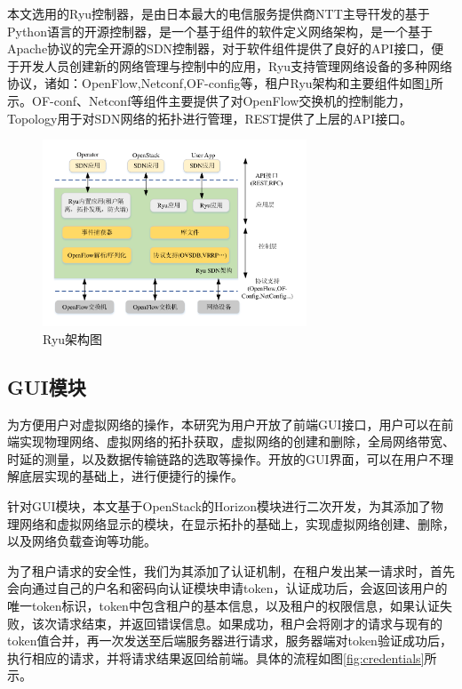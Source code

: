 本文选用的Ryu控制器，是由日本最大的电信服务提供商NTT主导幵发的基于Python语言的开源控制器，是一个基于组件的软件定义网络架构，是一个基于Apache协议的完全开源的SDN控制器，对于软件组件提供了良好的API接口，便于开发人员创建新的网络管理与控制中的应用，Ryu支持管理网络设备的多种网络协议，诸如：OpenFlow,Netconf,OF-config等，租户Ryu架构和主要组件如图\ref{fig:ryu}所示。OF-conf、Netconf等组件主要提供了对OpenFlow交换机的控制能力，Topology用于对SDN网络的拓扑进行管理，REST提供了上层的API接口。

\begin{figure}[!htb]
  \centering
  \includegraphics[width=0.7\textwidth]{logo/ryu}
  \caption{Ryu架构图}
  \label{fig:ryu}
\end{figure}

\subsection{GUI模块}
为方便用户对虚拟网络的操作，本研究为用户开放了前端GUI接口，用户可以在前端实现物理网络、虚拟网络的拓扑获取，虚拟网络的创建和删除，全局网络带宽、时延的测量，以及数据传输链路的选取等操作。开放的GUI界面，可以在用户不理解底层实现的基础上，进行便捷行的操作。

针对GUI模块，本文基于OpenStack的Horizon模块进行二次开发，为其添加了物理网络和虚拟网络显示的模块，在显示拓扑的基础上，实现虚拟网络创建、删除，以及网络负载查询等功能。

为了租户请求的安全性，我们为其添加了认证机制，在租户发出某一请求时，首先会向通过自己的户名和密码向认证模块申请token，认证成功后，会返回该用户的唯一token标识，token中包含租户的基本信息，以及租户的权限信息，如果认证失败，该次请求结束，并返回错误信息。如果成功，租户会将刚才的请求与现有的token值合并，再一次发送至后端服务器进行请求，服务器端对token验证成功后，执行相应的请求，并将请求结果返回给前端。具体的流程如图\ref{fig:credentials}所示。

